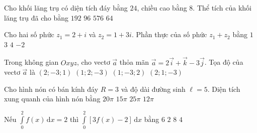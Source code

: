\begin{ex}%
	Cho khối lăng trụ có diện tích đáy bằng $24$, chiều cao bằng $8$. Thể tích của khối lăng trụ đã cho bằng
	\choice
	{\True $192$}
	{$96$}
	{$576$}
	{$64$}
\end{ex}

\begin{ex}%
	Cho hai số phức $z_1=2+i$ và $z_2=1+3i$. Phần thực của số phức $z_1+z_2$ bằng
	\choice
	{$1$}
	{\True $3$}
	{$4$}
	{$-2$}
\end{ex}

\begin{ex}%
	Trong không gian $Oxyz$, cho vectơ $\overrightarrow{a}$ thỏa mãn $\overrightarrow{a}=2\overrightarrow{i}+\overrightarrow{k}-3\overrightarrow{j}$. Tọa độ của vectơ $\overrightarrow{a}$ là
	\choice
	{\True $\left(2;-3;1\right)$}
	{$\left(1;2;-3\right)$}
	{$\left(1;-3;2\right)$}
	{$\left(2;1;-3\right)$}
\end{ex}

\begin{ex}%
	Cho hình nón có bán kính đáy $R=3$ và độ dài đường sinh $\ell=5$. Diện tích xung quanh của hình nón bằng
	\choice
	{$20\pi$}
	{\True $15\pi$}
	{$25\pi$}
	{$12\pi$}
\end{ex}

\begin{ex}%
	Nếu $\displaystyle\int\limits_0^2f(x)\mathrm{\,d}x=2$ thì $\displaystyle\int\limits_0^2\left[3f(x)-2\right]\mathrm{\,d}x$ bằng
	\choice
	{$6$}
	{\True $2$}
	{$8$}
	{$4$}
\end{ex}

